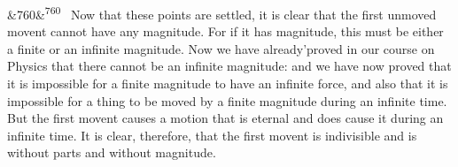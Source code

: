 \documentclass[12pt]{article}
\newcommand{\para}[1][]{\par\noindent\ifx&#1&\else\textsuperscript{\footnotesize #1}~\fi}
\begin{document}
\para[760] Now that these points are settled, it is clear that the first unmoved movent cannot have any magnitude. For if it has magnitude, this must be either a finite or an infinite magnitude. Now we have already'proved in our course on Physics that there cannot be an infinite magnitude: and we have now proved that it is impossible for a finite magnitude to have an infinite force, and also that it is impossible for a thing to be moved by a finite magnitude during an infinite time. But the first movent causes a motion that is eternal and does cause it during an infinite time. It is clear, therefore, that the first movent is indivisible and is without parts and without magnitude.
\end{document}
